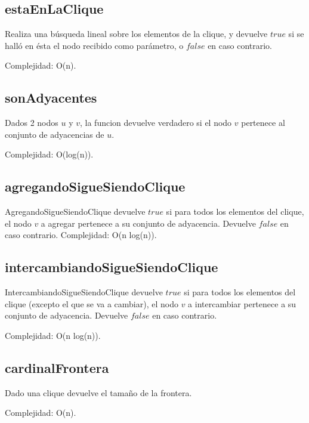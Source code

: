 \subsection{estaEnLaClique}
Realiza una búsqueda lineal sobre los elementos de la clique, y devuelve $true$ si se halló en ésta el nodo recibido como parámetro, o $false$ en caso contrario.

Complejidad: O(n).

\subsection{sonAdyacentes}
Dados 2 nodos $u$ y $v$, la funcion devuelve verdadero si el nodo $v$ pertenece al conjunto de adyacencias de $u$.

Complejidad: O(log(n)).

\subsection{agregandoSigueSiendoClique}
AgregandoSigueSiendoClique devuelve $true$ si para todos los elementos del clique, el nodo $v$ a agregar pertenece a su conjunto de adyacencia. Devuelve $false$ en caso contrario.
Complejidad: O(n log(n)).

\subsection{intercambiandoSigueSiendoClique}
IntercambiandoSigueSiendoClique devuelve $true$ si para todos los elementos del clique (excepto el que se va a cambiar), el nodo $v$ a intercambiar pertenece a su conjunto de adyacencia. Devuelve $false$ en caso contrario.

Complejidad: O(n log(n)).

\subsection{cardinalFrontera}
Dado una clique devuelve el tamaño de la frontera.

Complejidad: O(n).
